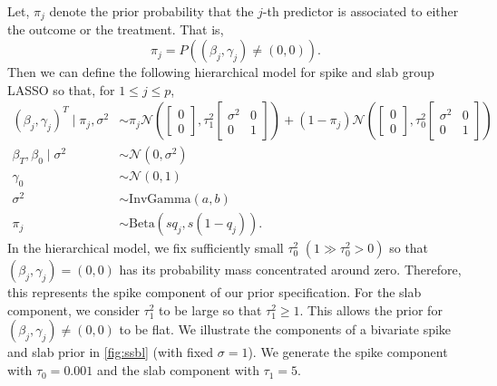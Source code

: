 \documentclass[oribibl]{llncs}
\newcommand{\normal}{\mathcal{N}}
\begin{document}
Let, $\pi_j$ denote the prior probability that the $j$-th
predictor is associated to either the outcome or the 
treatment. That is, 
\begin{equation}
	\pi_j = P\left((\beta_j,\gamma_j)\not=(0,0)\right).
\end{equation}
Then we can define the following hierarchical model for spike and 
slab group LASSO so that,
for $1\le j\le p$,
\begin{align}
	(\beta_j,\gamma_j)^T \mid \pi_{j}, \sigma^2 &\sim 
	\pi_{j}\normal\left( \begin{bmatrix}
		0 \\
		0
	\end{bmatrix}, 
	\tau_1^2\begin{bmatrix}
		\sigma^2 & 0 \\
		0 & 1
	\end{bmatrix}\right)
	+ (1-\pi_{j}) \normal\left(\begin{bmatrix}
		0 \\
		0
	\end{bmatrix}, 
	\tau_0^2\begin{bmatrix}
		\sigma^2 & 0 \\
		0 & 1
	\end{bmatrix}\right)\\
	\beta_T, \beta_0\mid \sigma^2 &\sim \normal\left(0, \sigma^2\right)\\
	\gamma_0 &\sim \normal(0,1)\\
	\sigma^2&\sim \text{InvGamma}(a, b)\\
	\pi_{j} &\sim\text{Beta}\left(sq_j, s(1-q_j)\right).
\end{align}
In the hierarchical model, we fix sufficiently small $\tau^2_0$
$(1\gg\tau_0^2>0)$ so that  $(\beta_j, \gamma_j) = (0,0)$ has its probability mass 
concentrated around zero. Therefore, this represents the spike component of our prior specification. 
For the slab component, we consider $\tau_1^2$ to be large so that $\tau_1^2\ge 1$. This allows the prior for $(\beta_j, \gamma_j)\not=(0,0)$ to be flat. 
We illustrate the components of a bivariate spike and slab prior in 
\cref{fig:ssbl} (with fixed $\sigma=1$). We generate the spike component 
with $\tau_0=0.001$ and the slab component with $\tau_1=5$.
\end{document}
